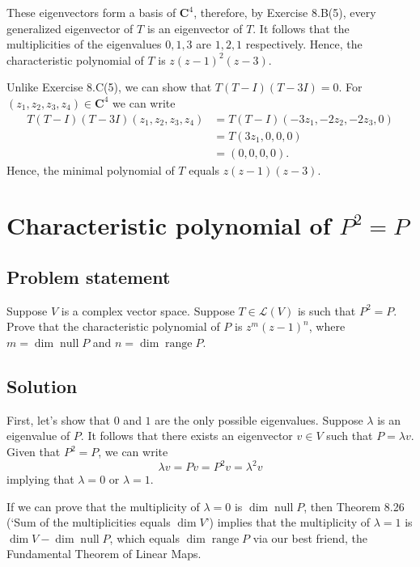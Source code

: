 \documentclass{article}
\begin{document}
These eigenvectors form a basis of $\mathbf{C}^4$, therefore, by Exercise 8.B(5), every generalized eigenvector of $T$ is an eigenvector of $T$. 
It follows that the multiplicities of the eigenvalues $0,1,3$ are $1,2,1$ respectively. Hence, the characteristic polynomial of $T$ is $z(z-1)^2(z-3)$.

Unlike Exercise 8.C(5), we can show that $T(T-I)(T-3I)=0$. 
For $(z_1,z_2,z_3,z_4)\in\mathbf{C}^4$ we can write
\begin{align*}
    T(T-I)(T-3I)(z_1,z_2,z_3,z_4)&=T(T-I)(-3z_1,-2z_2,-2z_3,0)\\
    &=T(3z_1,0,0,0)\\
    &=(0,0,0,0).
\end{align*}
Hence, the minimal polynomial of $T$ equals $z(z-1)(z-3)$.

\clearpage

\section{Characteristic polynomial of $P^2=P$}
\subsection*{Problem statement}
Suppose $V$ is a complex vector space. Suppose $T\in\mathcal{L}(V)$ is such that \newline
$P^2=P$. 
Prove that the characteristic polynomial of $P$ is $z^m(z-1)^n$, where \newline
$m=\operatorname{dim}\operatorname{null}P$ and $n=\operatorname{dim}\operatorname{range}P$.

\subsection*{Solution}
First, let's show that $0$ and $1$ are the only possible eigenvalues. Suppose $\lambda$ is an eigenvalue of $P$. It follows that there exists an eigenvector $v\in V$ such that $P=\lambda v$. Given that $P^2=P$, we can write
\begin{equation}
    \lambda v=Pv=P^2v=\lambda^2v
\end{equation}
implying that $\lambda=0$ or $\lambda=1$.

If we can prove that the multiplicity of $\lambda=0$ is $\operatorname{dim}\operatorname{null}P$, then Theorem 8.26 (`Sum of the multiplicities equals $\operatorname{dim}V$') implies that the multiplicity of $\lambda=1$ is $\operatorname{dim}V-\operatorname{dim}\operatorname{null}P$, which equals $\operatorname{dim}\operatorname{range}P$ via our best friend, the Fundamental Theorem of Linear Maps.
\end{document}
